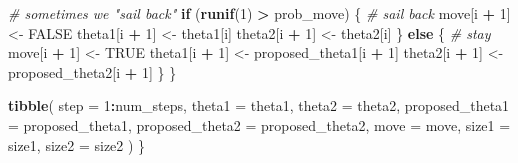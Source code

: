 \documentclass[
  12pt,
]{book}
\newenvironment{Shaded}{\begin{snugshade}}{\end{snugshade}}
\newcommand{\CommentTok}[1]{\textcolor[rgb]{0.56,0.35,0.01}{\textit{#1}}}
\newcommand{\ControlFlowTok}[1]{\textcolor[rgb]{0.13,0.29,0.53}{\textbf{#1}}}
\newcommand{\DataTypeTok}[1]{\textcolor[rgb]{0.13,0.29,0.53}{#1}}
\newcommand{\DecValTok}[1]{\textcolor[rgb]{0.00,0.00,0.81}{#1}}
\newcommand{\FloatTok}[1]{\textcolor[rgb]{0.00,0.00,0.81}{#1}}
\newcommand{\KeywordTok}[1]{\textcolor[rgb]{0.13,0.29,0.53}{\textbf{#1}}}
\newcommand{\NormalTok}[1]{#1}
\newcommand{\OperatorTok}[1]{\textcolor[rgb]{0.81,0.36,0.00}{\textbf{#1}}}
\newcommand{\OtherTok}[1]{\textcolor[rgb]{0.56,0.35,0.01}{#1}}
\newcommand{\StringTok}[1]{\textcolor[rgb]{0.31,0.60,0.02}{#1}}
\theoremstyle{definition}
\theoremstyle{definition}
\theoremstyle{definition}
\theoremstyle{remark}
\begin{document}
\begin{Shaded}
\begin{Highlighting}[]
    \CommentTok{# sometimes we "sail back"}
    \ControlFlowTok{if}\NormalTok{ (}\KeywordTok{runif}\NormalTok{(}\DecValTok{1}\NormalTok{) }\OperatorTok{>}\StringTok{ }\NormalTok{prob_move) \{ }\CommentTok{# sail back}
\NormalTok{       move[i }\OperatorTok{+}\StringTok{ }\DecValTok{1}\NormalTok{] <-}\StringTok{ }\OtherTok{FALSE}
\NormalTok{      theta1[i }\OperatorTok{+}\StringTok{ }\DecValTok{1}\NormalTok{] <-}\StringTok{ }\NormalTok{theta1[i]}
\NormalTok{      theta2[i }\OperatorTok{+}\StringTok{ }\DecValTok{1}\NormalTok{] <-}\StringTok{ }\NormalTok{theta2[i]}
\NormalTok{    \} }\ControlFlowTok{else}\NormalTok{ \{                    }\CommentTok{# stay}
\NormalTok{       move[i }\OperatorTok{+}\StringTok{ }\DecValTok{1}\NormalTok{] <-}\StringTok{ }\OtherTok{TRUE}
\NormalTok{      theta1[i }\OperatorTok{+}\StringTok{ }\DecValTok{1}\NormalTok{] <-}\StringTok{ }\NormalTok{proposed_theta1[i }\OperatorTok{+}\StringTok{ }\DecValTok{1}\NormalTok{]}
\NormalTok{      theta2[i }\OperatorTok{+}\StringTok{ }\DecValTok{1}\NormalTok{] <-}\StringTok{ }\NormalTok{proposed_theta2[i }\OperatorTok{+}\StringTok{ }\DecValTok{1}\NormalTok{]}
\NormalTok{    \}}
\NormalTok{  \}}
  
  \KeywordTok{tibble}\NormalTok{(}
    \DataTypeTok{step =} \DecValTok{1}\OperatorTok{:}\NormalTok{num_steps, }
    \DataTypeTok{theta1 =}\NormalTok{ theta1,}
    \DataTypeTok{theta2 =}\NormalTok{ theta2,}
    \DataTypeTok{proposed_theta1 =}\NormalTok{ proposed_theta1,}
    \DataTypeTok{proposed_theta2 =}\NormalTok{ proposed_theta2,}
    \DataTypeTok{move =}\NormalTok{ move, }
    \DataTypeTok{size1 =}\NormalTok{ size1,}
    \DataTypeTok{size2 =}\NormalTok{ size2}
\NormalTok{  )}
\NormalTok{\}}
\end{Highlighting}
\end{Shaded}

\begin{Shaded}
\end{Shaded}
\end{document}
